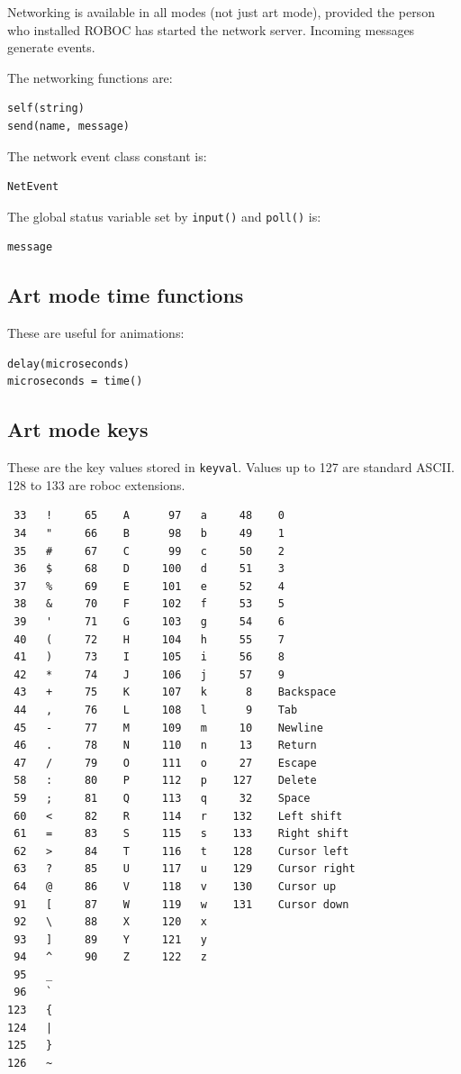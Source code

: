 \documentclass[12pt,a4paper,twoside]{article}
\renewcommand{\_}{\texttt{\symbol{95}}}
\begin{document}
Networking is available in all modes (not just art mode), provided the
person who installed ROBOC has started the network server.
Incoming messages generate events.

The networking functions are:

\begin{verbatim}
self(string)
send(name, message)
\end{verbatim}

The network event class constant is:

\begin{verbatim}
NetEvent
\end{verbatim}

The global status variable set by \verb^input()^ and \verb^poll()^ is:

\begin{verbatim}
message
\end{verbatim}

\subsection{Art mode time functions}

These are useful for animations:

\begin{verbatim}
delay(microseconds)
microseconds = time()
\end{verbatim}

\newpage
\subsection{Art mode keys}

These are the key values stored in \verb^keyval^.
Values up to 127 are standard ASCII.
128 to 133 are roboc extensions.

\begin{verbatim}
 33   !     65    A      97   a     48    0
 34   "     66    B      98   b     49    1
 35   #     67    C      99   c     50    2
 36   $     68    D     100   d     51    3
 37   %     69    E     101   e     52    4
 38   &     70    F     102   f     53    5
 39   '     71    G     103   g     54    6
 40   (     72    H     104   h     55    7
 41   )     73    I     105   i     56    8
 42   *     74    J     106   j     57    9
 43   +     75    K     107   k      8    Backspace
 44   ,     76    L     108   l      9    Tab
 45   -     77    M     109   m     10    Newline
 46   .     78    N     110   n     13    Return
 47   /     79    O     111   o     27    Escape
 58   :     80    P     112   p    127    Delete
 59   ;     81    Q     113   q     32    Space
 60   <     82    R     114   r    132    Left shift
 61   =     83    S     115   s    133    Right shift
 62   >     84    T     116   t    128    Cursor left
 63   ?     85    U     117   u    129    Cursor right
 64   @     86    V     118   v    130    Cursor up
 91   [     87    W     119   w    131    Cursor down
 92   \     88    X     120   x
 93   ]     89    Y     121   y
 94   ^     90    Z     122   z
 95   _
 96   `
123   {
124   |
125   }
126   ~
\end{verbatim}
\end{document}
